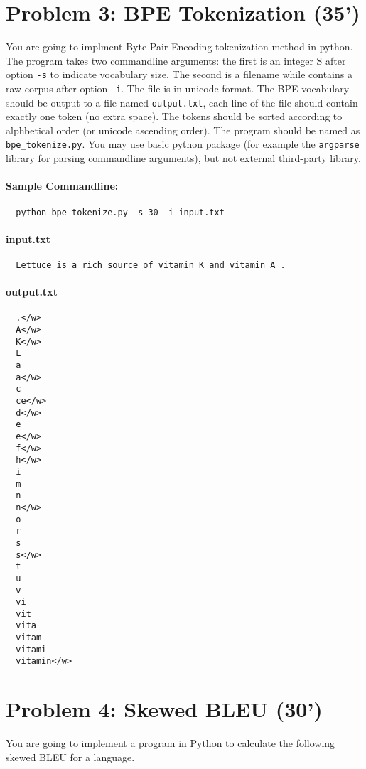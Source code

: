 \documentclass[12pt,letterpaper]{article}
\begin{document}
\section*{Problem 3: BPE Tokenization (35')} 
You are going to implment Byte-Pair-Encoding tokenization method in python.  
The program takes two commandline arguments: the first is an integer S after option \texttt{-s} to indicate vocabulary size. 
The second is a filename while contains a raw corpus after option \texttt{-i}. The file is in unicode format.  
The BPE vocabulary should be output to a file named \texttt{output.txt}, each line of the file should contain exactly one token (no extra space).
The tokens should be sorted according to alphbetical order (or unicode ascending order). 
The program should be named as \texttt{bpe\_tokenize.py}.
You may use basic python package (for example the \texttt{argparse} library for parsing commandline arguments), but not external third-party library.

\paragraph{Sample Commandline:}
\begin{verbatim}
  python bpe_tokenize.py -s 30 -i input.txt
\end{verbatim}

\paragraph{input.txt}
\begin{verbatim}
  Lettuce is a rich source of vitamin K and vitamin A .
\end{verbatim}

\paragraph{output.txt}
\begin{verbatim}
  .</w>
  A</w>
  K</w>
  L
  a
  a</w>
  c
  ce</w>
  d</w>
  e
  e</w>
  f</w>
  h</w>
  i
  m
  n
  n</w>
  o
  r
  s
  s</w>
  t
  u
  v
  vi
  vit
  vita
  vitam
  vitami
  vitamin</w>
\end{verbatim}

\section*{Problem 4: Skewed BLEU (30')} 
You are going to implement a program in Python to calculate the following skewed BLEU for a language.
\end{document}

